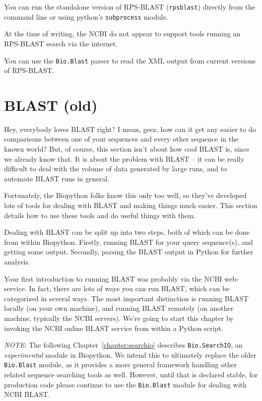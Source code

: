 You can run the standalone version of RPS-BLAST (\verb|rpsblast|) directly
from the command line or using python's \verb|subprocess| module.

At the time of writing, the NCBI do not appear to support tools running an
RPS-BLAST search via the internet.

You can use the \verb|Bio.Blast| parser to read the XML output from
current versions of RPS-BLAST.

\chapter{BLAST (old)}
\label{chapter:blast_old}
Hey, everybody loves BLAST right? I mean, geez, how can it get any easier to do comparisons between one of your sequences and every other sequence in the known world? But, of course, this section isn't about how cool BLAST is, since we already know that. It is about the problem with BLAST -- it can be really difficult to deal with the volume of data generated by large runs, and to automate BLAST runs in general.

Fortunately, the Biopython folks know this only too well, so they've developed lots of tools for dealing with BLAST and making things much easier. This section details how to use these tools and do useful things with them.

Dealing with BLAST can be split up into two steps, both of which can be done from within Biopython.
Firstly, running BLAST for your query sequence(s), and getting some output.
Secondly, parsing the BLAST output in Python for further analysis.

Your first introduction to running BLAST was probably via the NCBI web-service.
In fact, there are lots of ways you can run BLAST, which can be categorized in several ways.
The most important distinction is running BLAST locally (on your own machine),
and running BLAST remotely (on another machine, typically the NCBI servers).
We're going to start this chapter by invoking the NCBI online BLAST service
from within a Python script.

\emph{NOTE}: The following Chapter~\ref{chapter:searchio} describes
\verb|Bio.SearchIO|, an \emph{experimental} module in Biopython. We
intend this to ultimately replace the older \verb|Bio.Blast| module, as it
provides a more general framework handling other related sequence
searching tools as well. However, until that is declared stable, for
production code please continue to use the  \verb|Bio.Blast| module
for dealing with NCBI BLAST.

